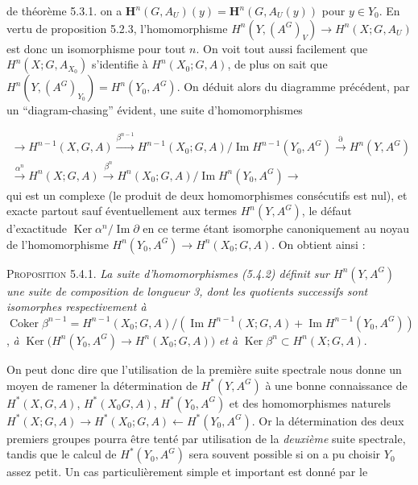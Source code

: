 \clearpage
{}

\noindent de théorème 5.3.1. on a
$\mathbf H^n(G,A_U)(y)=\mathbf H^n(G,A_U(y))$ pour $y\in Y_0$. En vertu de
proposition 5.2.3, l'homomorphisme
$H^n(Y,(A^G)_V)\to H^n(X;G,A_U)$ est donc un isomorphisme pour
tout $n$. On voit tout aussi facilement que $H^n(X;G,A_{X_0})$ s'identifie à
$H^n(X_0;G,A)$, de plus on sait que
$H^n(Y,(A^G)_{Y_0})=H^n(Y_0,A^G)$. On déduit alors du diagramme précédent,
par un ``diagram-chasing'' évident, une suite d'homomorphismes

\[
\tag{5.4.2}
\begin{gathered}
{}\to H^{n-1}(X,G,A)
 \xrightarrow{\beta^{n-1}}
 H^{n-1}(X_0;G,A)/\operatorname{Im}H^{n-1}(Y_0,A^G)
 \xrightarrow{\partial} H^n(Y,A^G)\\[-0.2em]
 \xrightarrow{\alpha^n}H^n(X;G,A)
 \xrightarrow{\beta^n}
 H^n(X_0;G,A)/\operatorname{Im}H^n(Y_0,A^G)
 \to
\end{gathered}
\]
qui est un complexe (le produit de deux homomorphismes consécutifs est nul),
et exacte partout sauf éventuellement aux termes $H^n(Y,A^G)$, le défaut
d'exactitude $\operatorname{Ker}\alpha^n/\operatorname{Im}\partial$ en ce
terme étant isomorphe canoniquement au noyau de l'homomorphisme
$H^n(Y_0,A^G)\to H^n(X_0;G,A)$. On obtient ainsi :

\textsc{Proposition 5.4.1.} \textit{La suite d'homomorphismes \textup{(5.4.2)}
définit sur $H^n(Y,A^G)$ une suite de composition de longueur \textup{3}, dont les
quotients successifs sont isomorphes respectivement à}
$\operatorname{Coker}\beta^{n-1}=H^{n-1}(X_0;G,A)/(\operatorname{Im}H^{n-1}(X;G,A)+\operatorname{Im}H^{n-1}(Y_0,A^G))$,
\textit{à}
$\operatorname{Ker}\bigl(H^n(Y_0,A^G)\to H^n(X_0;G,A)\bigr)$
\textit{et à} $\operatorname{Ker}\beta^n\subset H^n(X;G,A)$.

On peut donc dire que l'utilisation de la première suite spectrale nous donne
un moyen de ramener la détermination de $H^*(Y,A^G)$ à une bonne connaissance
de $H^*(X,G,A)$, $H^*(X_0G,A)$, $H^*(Y_0,A^G)$ et des homomorphismes naturels
$H^*(X;G,A)\to H^*(X_0;G,A)\leftarrow H^*(Y_0,A^G)$.
Or la détermination des deux premiers groupes pourra être tenté par
utilisation de la \textit{deuxième} suite spectrale, tandis que le calcul de
$H^*(Y_0,A^G)$ sera souvent possible si on a pu choisir $Y_0$ assez petit. Un
cas particulièrement simple et important est donné par le

